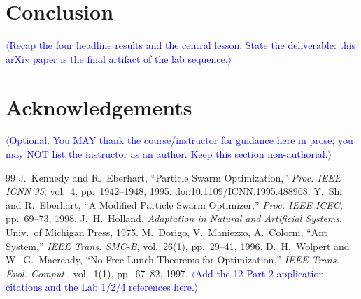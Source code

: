 \documentclass[11pt]{article}
\newcommand{\PH}[1]{\textcolor{blue}{$\langle$#1$\rangle$}}   %
\begin{document}
\section{Conclusion}
\label{sec:conclusion}
\PH{Recap the four headline results and the central lesson. State the
deliverable: this arXiv paper is the final artifact of the lab sequence.}

\section*{Acknowledgements}
\PH{Optional. You MAY thank the course/instructor for guidance here in prose;
you may NOT list the instructor as an author. Keep this section non-authorial.}

\begin{thebibliography}{99}
 J.~Kennedy and R.~Eberhart, ``Particle Swarm
Optimization,'' \emph{Proc. IEEE ICNN'95}, vol.~4, pp.~1942--1948, 1995.
doi:10.1109/ICNN.1995.488968.
 Y.~Shi and R.~Eberhart, ``A Modified Particle Swarm
Optimizer,'' \emph{Proc. IEEE ICEC}, pp.~69--73, 1998.
 J.~H.~Holland, \emph{Adaptation in Natural and Artificial
Systems}. Univ.\ of Michigan Press, 1975.
 M.~Dorigo, V.~Maniezzo, A.~Colorni, ``Ant System,''
\emph{IEEE Trans. SMC-B}, vol.~26(1), pp.~29--41, 1996.
 D.~H.~Wolpert and W.~G.~Macready, ``No Free Lunch Theorems
for Optimization,'' \emph{IEEE Trans. Evol. Comput.}, vol.~1(1), pp.~67--82, 1997.
\PH{Add the 12 Part-2 application citations and the Lab 1/2/4 references here.}
\end{thebibliography}
\end{document}
